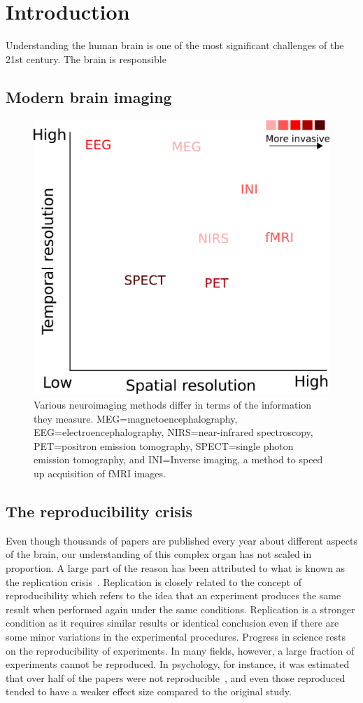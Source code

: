 \chapter{Introduction}

Understanding the human brain is one of the most significant challenges of the 21st century. The brain is responsible

\section{Modern brain imaging}

\begin{figure}[htb]
\begin{center}
   \includegraphics[width=0.4\linewidth]{figures/neuroimaging_methods.pdf}
\end{center}
   \caption[Various neuroimaging methods differ in terms of the information they measure.]{Various neuroimaging methods differ in terms of the information they measure. MEG=magnetoencephalography, EEG=electroencephalography, NIRS=near-infrared spectroscopy, PET=positron emission tomography, SPECT=single photon emission tomography, and INI=Inverse imaging, a method to speed up acquisition of fMRI images.}
   \label{fig:neuroimaging_methods}
\end{figure}

\section{The reproducibility crisis}

Even though thousands of papers are published every year about different aspects of the brain, our understanding of this complex organ has not scaled in proportion. A large part of the reason has been attributed to what is known as the replication crisis~\citep{ioannidis2005most, simmons2011false, button2013power}. Replication is closely related to the concept of reproducibility which refers to the idea that an experiment produces the same result when performed again under the same conditions. Replication is a stronger condition as it requires similar results or identical conclusion even if there are some minor variations in the experimental procedures. Progress in science rests on the reproducibility of experiments. In many fields, however, a large fraction of experiments cannot be reproduced. In psychology, for instance, it was estimated that over half of the papers were not reproducible~\citep{open2015estimating}, and even those reproduced tended to have a weaker effect size compared to the original study. 

